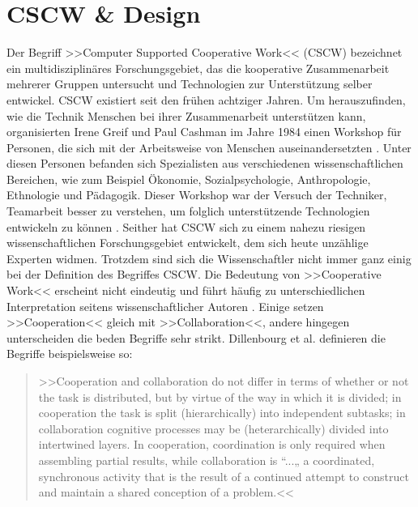 \chapter{CSCW \& Design}\label{ch:CSCWDesign}

	Der Begriff >>Computer Supported Cooperative Work<< (CSCW) bezeichnet ein multidisziplinäres Forschungsgebiet, das die kooperative Zusammenarbeit mehrerer Gruppen untersucht und Technologien zur Unterstützung selber entwickel. CSCW existiert seit den frühen achtziger Jahren. Um herauszufinden, wie die Technik Menschen bei ihrer Zusammenarbeit unterstützen kann, organisierten Irene Greif und Paul Cashman im Jahre 1984 einen Workshop für Personen, die sich mit der Arbeitsweise von Menschen auseinandersetzten \citep{Grudin:1994}. Unter diesen Personen befanden sich Spezialisten aus verschiedenen wissenschaftlichen Bereichen, wie zum Beispiel Ökonomie, Sozialpsychologie, Anthropologie, Ethnologie und Pädagogik. Dieser Workshop war der Versuch der Techniker, Teamarbeit besser zu verstehen, um folglich unterstützende Technologien entwickeln zu können \citep{Grudin:1994, Rama:2006p245}. Seither hat CSCW sich zu einem nahezu riesigen wissenschaftlichen Forschungsgebiet entwickelt, dem sich heute unzählige Experten widmen. Trotzdem sind sich die Wissenschaftler nicht immer ganz einig bei der Definition des Begriffes CSCW. Die Bedeutung von >>Cooperative Work<< erscheint nicht eindeutig und führt häufig zu unterschiedlichen Interpretation seitens wissenschaftlicher Autoren \citep{Gerlicher:2007p241}. Einige setzen >>Cooperation<< gleich mit >>Collaboration<<, andere hingegen unterscheiden die beden Begriffe sehr strikt. Dillenbourg et al. definieren die Begriffe beispielsweise so: 
	
	\medskip\begin{quote}{>>Cooperation and collaboration do not differ in terms of whether or not the task is distributed, but by virtue of the way in which it is divided; in cooperation the task is split (hierarchically) into independent subtasks; in collaboration cognitive processes may be (heterarchically) divided into intertwined layers. In cooperation, coordination is only required when assembling partial results, while collaboration is “...„ a coordinated, synchronous activity that is the result of a continued attempt to construct and maintain a shared conception of a problem.<<} \citep{Dillenbourg:1995} \end{quote}
	
